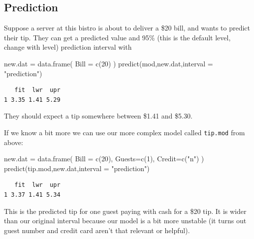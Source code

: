 \documentclass[
  letterpaper,
  DIV=11,
  numbers=noendperiod]{scrreprt}
\newenvironment{Shaded}{\begin{snugshade}}{\end{snugshade}}
\newcommand{\AttributeTok}[1]{\textcolor[rgb]{0.49,0.56,0.16}{#1}}
\newcommand{\DecValTok}[1]{\textcolor[rgb]{0.25,0.63,0.44}{#1}}
\newcommand{\FunctionTok}[1]{\textcolor[rgb]{0.02,0.16,0.49}{#1}}
\newcommand{\NormalTok}[1]{\textcolor[rgb]{0.00,0.44,0.13}{#1}}
\newcommand{\OtherTok}[1]{\textcolor[rgb]{0.00,0.44,0.13}{#1}}
\newcommand{\StringTok}[1]{\textcolor[rgb]{0.25,0.44,0.63}{#1}}
\begin{document}
\hypertarget{prediction}{%
\subsection{Prediction}\label{prediction}}

Suppose a server at this bistro is about to deliver a \$20 bill, and
wants to predict their tip. They can get a predicted value and 95\%
(this is the default level, change with level) prediction interval with

\begin{Shaded}
\begin{Highlighting}[]
\NormalTok{new.dat }\OtherTok{=} \FunctionTok{data.frame}\NormalTok{( }\AttributeTok{Bill =} \FunctionTok{c}\NormalTok{(}\DecValTok{20}\NormalTok{) )}
\FunctionTok{predict}\NormalTok{(mod,new.dat,}\AttributeTok{interval =} \StringTok{"prediction"}\NormalTok{)}
\end{Highlighting}
\end{Shaded}

\begin{verbatim}
   fit  lwr  upr
1 3.35 1.41 5.29
\end{verbatim}

They should expect a tip somewhere between \$1.41 and \$5.30.

If we know a bit more we can use our more complex model called
\texttt{tip.mod} from above:

\begin{Shaded}
\begin{Highlighting}[]
\NormalTok{new.dat }\OtherTok{=} \FunctionTok{data.frame}\NormalTok{( }\AttributeTok{Bill =} \FunctionTok{c}\NormalTok{(}\DecValTok{20}\NormalTok{), }\AttributeTok{Guests=}\FunctionTok{c}\NormalTok{(}\DecValTok{1}\NormalTok{), }\AttributeTok{Credit=}\FunctionTok{c}\NormalTok{(}\StringTok{"n"}\NormalTok{) )}
\FunctionTok{predict}\NormalTok{(tip.mod,new.dat,}\AttributeTok{interval =} \StringTok{"prediction"}\NormalTok{)}
\end{Highlighting}
\end{Shaded}

\begin{verbatim}
   fit  lwr  upr
1 3.37 1.41 5.34
\end{verbatim}

This is the predicted tip for one guest paying with cash for a \$20 tip.
It is wider than our original interval because our model is a bit more
unstable (it turns out guest number and credit card aren't that relevant
or helpful).
\end{document}
